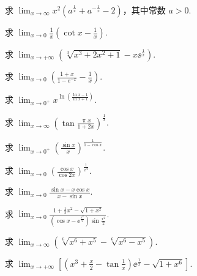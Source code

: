 	\begin{ti}
		求 $\lim_{x \to \infty} x^{2} \left( a^{\frac{1}{x}} + a^{-\frac{1}{x}} - 2 \right)$，其中常数 $a > 0$.
	\end{ti}

	\begin{ti}
		求 $\lim_{x \to 0}\frac{1}{x}\left( \cot x - \frac{1}{x} \right)$.
	\end{ti}

	\begin{ti}
		求 $\lim_{x \to +\infty}\left( \sqrt[3]{x^{3} + 2x^{2} + 1} - x\ee^{\frac{1}{x}} \right)$.
	\end{ti}

	\begin{ti}
		求 $\lim_{x \to 0}\left( \frac{1+x}{1-e^{-x}} - \frac{1}{x} \right)$.
	\end{ti}

	\begin{ti}
		求 $\lim_{x \to 0^{+}} x^{\ln\left( \frac{\ln x - 1}{\ln x + 1} \right)}$.
	\end{ti}

	\begin{ti}
		求 $\lim_{x \to \infty} \left( \tan\frac{\uppi x}{1 + 2x} \right)^{\frac{1}{x}}$.
	\end{ti}

	\begin{ti}
		求 $\lim_{x \to 0^{+}} \left( \frac{\sin x}{x} \right)^{\frac{1}{1 - \cos x}}$.
	\end{ti}

	\begin{ti}
		求 $\lim_{x \to 0}\left( \frac{\cos x}{\cos 2x} \right)^{\frac{1}{x^{2}}}$.
	\end{ti}

	\begin{ti}
		求 $\lim_{x \to 0} \frac{\sin x - x\cos x}{x - \sin x}$.
	\end{ti}

	\begin{ti}
		求 $\lim_{x \to 0}\frac{1 + \frac{1}{2}x^{2} - \sqrt{1 + x^{2}}}{\left( \cos x - \ee^{\frac{x^{2}}{2}} \right) \sin \frac{x^{2}}{2}}$.
	\end{ti}

	\begin{ti}
		求 $\lim_{x \to \infty} \left( \sqrt[6]{x^{6} + x^{5}} - \sqrt[6]{x^{6} - x^{5}} \right)$.
	\end{ti}

	\begin{ti}
		求 $\lim_{x \to +\infty}\left[ \left( x^{3} + \frac{x}{2} - \tan \frac{1}{x} \right) \ee^{\frac{1}{x}} - \sqrt{1 + x^{6}} \right]$.
	\end{ti}

